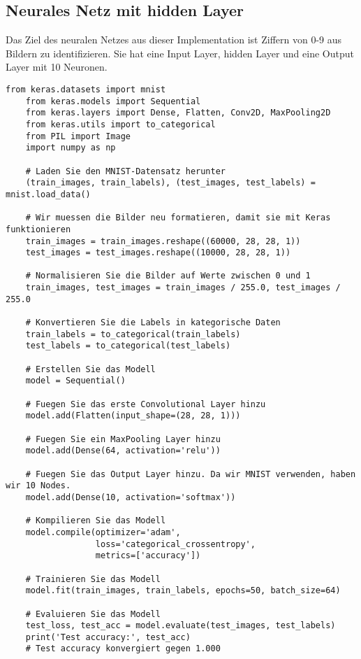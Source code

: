 \subsection{Neurales Netz mit hidden Layer}
Das Ziel des neuralen Netzes aus dieser Implementation ist Ziffern von 0-9 aus Bildern zu identifizieren. Sie hat eine Input Layer, hidden Layer 
und eine Output Layer mit 10 Neuronen.
\begin{lstlisting}[basicstyle=\ttfamily\footnotesize]
    from keras.datasets import mnist
    from keras.models import Sequential
    from keras.layers import Dense, Flatten, Conv2D, MaxPooling2D
    from keras.utils import to_categorical
    from PIL import Image
    import numpy as np
    
    # Laden Sie den MNIST-Datensatz herunter
    (train_images, train_labels), (test_images, test_labels) = mnist.load_data()
    
    # Wir muessen die Bilder neu formatieren, damit sie mit Keras funktionieren
    train_images = train_images.reshape((60000, 28, 28, 1))
    test_images = test_images.reshape((10000, 28, 28, 1))
    
    # Normalisieren Sie die Bilder auf Werte zwischen 0 und 1
    train_images, test_images = train_images / 255.0, test_images / 255.0
    
    # Konvertieren Sie die Labels in kategorische Daten
    train_labels = to_categorical(train_labels)
    test_labels = to_categorical(test_labels)
    
    # Erstellen Sie das Modell
    model = Sequential()
    
    # Fuegen Sie das erste Convolutional Layer hinzu
    model.add(Flatten(input_shape=(28, 28, 1)))
    
    # Fuegen Sie ein MaxPooling Layer hinzu
    model.add(Dense(64, activation='relu'))
    
    # Fuegen Sie das Output Layer hinzu. Da wir MNIST verwenden, haben wir 10 Nodes.
    model.add(Dense(10, activation='softmax'))
    
    # Kompilieren Sie das Modell
    model.compile(optimizer='adam',
                  loss='categorical_crossentropy',
                  metrics=['accuracy'])
    
    # Trainieren Sie das Modell
    model.fit(train_images, train_labels, epochs=50, batch_size=64)
    
    # Evaluieren Sie das Modell
    test_loss, test_acc = model.evaluate(test_images, test_labels)
    print('Test accuracy:', test_acc)
    # Test accuracy konvergiert gegen 1.000
\end{lstlisting}
